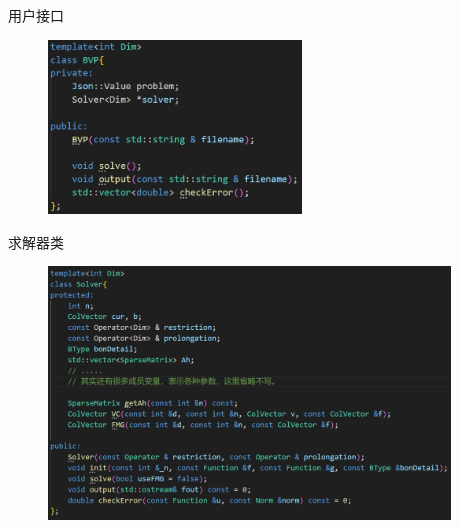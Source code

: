 \documentclass[9pt]{beamer}
\begin{document}
\begin{frame}{用户接口}
\begin{figure}[H]
\centering
\includegraphics[width=0.6\textwidth]{pic/userPlug.png}
\end{figure}
\end{frame}

\begin{frame}{求解器类}
\begin{figure}[H]
\centering
\includegraphics[width=0.95\textwidth]{pic/solver.png}
\end{figure}
\end{frame}
\end{document}
